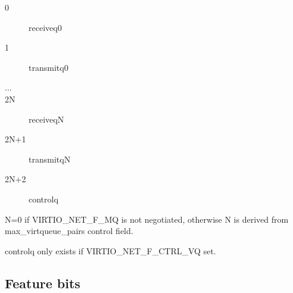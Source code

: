 \begin{description}
\item[0] receiveq0
\item[1] transmitq0
\item[...]
\item[2N] receiveqN
\item[2N+1] transmitqN
\item[2N+2] controlq
\end{description}

 N=0 if VIRTIO_NET_F_MQ is not negotiated, otherwise N is derived
 from max_virtqueue_pairs control field.

 controlq only exists if VIRTIO_NET_F_CTRL_VQ set.

\subsection{Feature bits}\label{sec:Device Types / Network Device / Feature bits}

